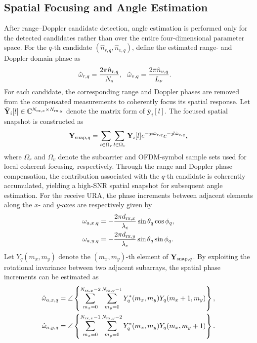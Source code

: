 \documentclass[conference]{IEEEtran}
\begin{document}
\subsection{Spatial Focusing and Angle Estimation} After range--Doppler candidate detection, angle estimation is performed only for the detected candidates rather than over the entire four-dimensional parameter space. For the $q$-th candidate $(\hat n_{r,q},\hat n_{v,q})$, define the estimated range- and Doppler-domain phase as 
\begin{align} 
\hat{\omega}_{r,q} &= \frac{2\pi\hat n_{r,q}}{N_{\rm s}}, ~~
\hat{\omega}_{v,q} = \frac{2\pi\hat n_{v,q}}{L_{\nu}}. \label{eq:doppler_phase} 
\end{align} 
For each candidate, the corresponding range and Doppler phases are removed from the compensated measurements to coherently focus its spatial response. Let $\bar{\mathbf{Y}}_i[l]\in \mathbb{C}^{N_{{\rm rx},x}\times N_{{\rm rx},y}}$ denote the matrix form of $\bar{\mathbf{y}}_i[l]$. The focused spatial snapshot is constructed as 
\begin{align} 
\mathbf{Y}_{{\rm snap},q} = \sum_{i\in\Omega_r} \sum_{l\in\Omega_v} \bar{\mathbf{Y}}_i[l] e^{-\jmath i\hat{\omega}_{r,q}} e^{-\jmath l\hat{\omega}_{v,q}}, \label{eq:spatial_snapshot} 
\end{align} 
where $\Omega_r$ and $\Omega_v$ denote the subcarrier and OFDM-symbol sample sets used for local coherent focusing, respectively. Through the range and Doppler phase compensation, the contribution associated with the $q$-th candidate is coherently accumulated, yielding a high-SNR spatial snapshot for subsequent angle estimation. For the receive URA, the phase increments between adjacent elements along the $x$- and $y$-axes are respectively given by 
\begin{align} 
\omega_{a,x,q} &= -\frac{2\pi d_{{\rm rx},x}}{\lambda_c} \sin\theta_q\cos\phi_q, \label{eq:angle_phase_x}\\ \omega_{a,y,q} &= -\frac{2\pi d_{{\rm rx},y}}{\lambda_c} \sin\theta_q\sin\phi_q. \label{eq:angle_phase_y} 
\end{align} 
Let $Y_q(m_x,m_y)$ denote the $(m_x,m_y)$-th element of $\mathbf{Y}_{{\rm snap},q}$. By exploiting the rotational invariance between two adjacent subarrays, the spatial phase increments can be estimated as 
\begin{align} 
\hat{\omega}_{a,x,q} = \angle \left\{ \sum_{m_x=0}^{N_{{\rm rx},x}-2} \sum_{m_y=0}^{N_{{\rm rx},y}-1} Y_q^{*}(m_x,m_y) Y_q(m_x+1,m_y) \right\}, \notag \\
\hat{\omega}_{a,y,q} = \angle \left\{ \sum_{m_x=0}^{N_{{\rm rx},x}-1} \sum_{m_y=0}^{N_{{\rm rx},y}-2} Y_q^{*}(m_x,m_y) Y_q(m_x,m_y+1) \right\}. \label{eq:phase_y_est} 
\end{align} 
\end{document}
